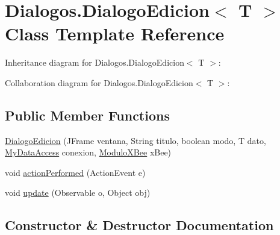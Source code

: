\hypertarget{class_dialogos_1_1_dialogo_edicion}{}\section{Dialogos.\+Dialogo\+Edicion$<$ T $>$ Class Template Reference}
\label{class_dialogos_1_1_dialogo_edicion}


Inheritance diagram for Dialogos.\+Dialogo\+Edicion$<$ T $>$\+:


Collaboration diagram for Dialogos.\+Dialogo\+Edicion$<$ T $>$\+:
\subsection*{Public Member Functions}
\begin{DoxyCompactItemize}
\item 
\mbox{\hyperlink{class_dialogos_1_1_dialogo_edicion_a3faa9a40dae2814c946acaaacec3f708}{Dialogo\+Edicion}} (J\+Frame ventana, String titulo, boolean modo, T dato, \mbox{\hyperlink{classconexion_s_q_l_1_1_my_data_access}{My\+Data\+Access}} conexion, \mbox{\hyperlink{classcomunicacion_1_1_modulo_x_bee}{Modulo\+X\+Bee}} x\+Bee)
\item 
void \mbox{\hyperlink{class_dialogos_1_1_dialogo_edicion_a78705fff13d0b9999644b7a31ffea151}{action\+Performed}} (Action\+Event e)
\item 
void \mbox{\hyperlink{class_dialogos_1_1_dialogo_edicion_afcbec7817a74ba686ef1a00a33b48484}{update}} (Observable o, Object obj)
\end{DoxyCompactItemize}


\subsection{Constructor \& Destructor Documentation}
\mbox{\label{class_dialogos_1_1_dialogo_edicion_a3faa9a40dae2814c946acaaacec3f708}} 
